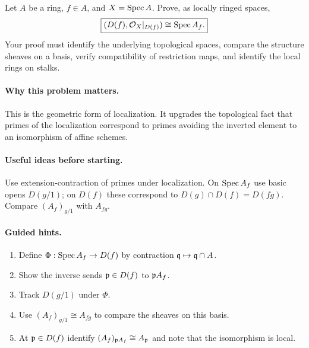 \begin{problem}\label{prob:vi18-p01}
Let $A$ be a ring, $f\in A$, and $X=\operatorname{Spec} A$.  Prove, as locally ringed spaces,
\[
\boxed{(D(f),\mathcal O_X|_{D(f)})\cong\operatorname{Spec} A_f.}
\]
Your proof must identify the underlying topological spaces, compare the structure sheaves on a basis, verify compatibility of restriction maps, and identify the local rings on stalks.
\end{problem}

\ifdefined\FullProblemDossiers
\paragraph{Why this problem matters.}
This is the geometric form of localization. It upgrades the topological fact that primes of the localization correspond to primes avoiding the inverted element to an isomorphism of affine schemes.

\paragraph{Useful ideas before starting.}
Use extension-contraction of primes under localization. On $\operatorname{Spec} A_f$ use basic opens $D(g/1)$; on $D(f)$ these correspond to $D(g)\cap D(f)=D(fg)$. Compare $(A_f)_{g/1}$ with $A_{fg}$.

\paragraph{Guided hints.}
\begin{enumerate}
\item Define $\Phi:\operatorname{Spec} A_f\to D(f)$ by contraction $\mathfrak q\mapsto\mathfrak q\cap A$.
\item Show the inverse sends $\mathfrak p\in D(f)$ to $\mathfrak p A_f$.
\item Track $D(g/1)$ under $\Phi$.
\item Use $(A_f)_{g/1}\cong A_{fg}$ to compare the sheaves on this basis.
\item At $\mathfrak p\in D(f)$ identify $(A_f)_{\mathfrak p A_f}\cong A_{\mathfrak p}$ and note that the isomorphism is local.
\end{enumerate}

